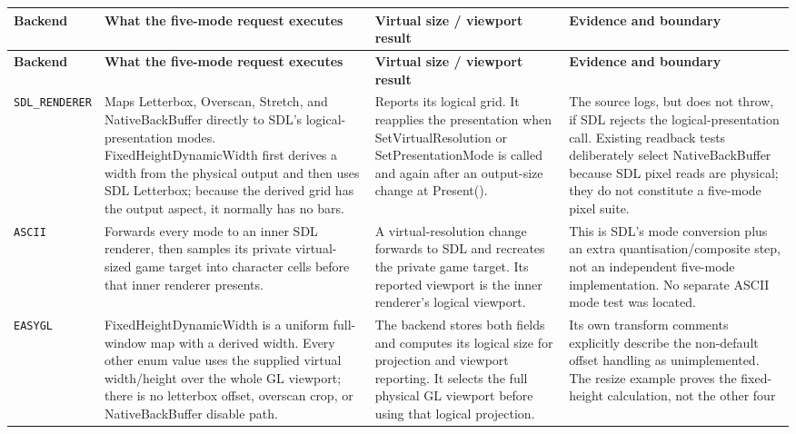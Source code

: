 \begingroup
\small
\setlength{\tabcolsep}{2.7pt}
\renewcommand{\arraystretch}{1.14}
\begin{longtable}{@{}p{}p{}p{}p{}@{}}
\toprule
\textbf{Backend} & \textbf{What the five-mode request executes} &
\textbf{Virtual size / viewport result} & \textbf{Evidence and boundary} \\
\midrule
\endfirsthead
\toprule
\textbf{Backend} & \textbf{What the five-mode request executes} &
\textbf{Virtual size / viewport result} & \textbf{Evidence and boundary} \\
\midrule
\endhead
\texttt{SDL\_\allowbreak RENDERER}
  & Maps Letterbox, Overscan, Stretch, and NativeBackBuffer directly to SDL's logical-
    presentation modes. FixedHeightDynamicWidth first derives a width from the physical output
    and then uses SDL Letterbox; because the derived grid has the output aspect, it normally has
    no bars.
  & Reports its logical grid. It reapplies the presentation when SetVirtualResolution or
    SetPresentationMode is called and again after an output-size change at Present().
  & The source logs, but does not throw, if SDL rejects the logical-presentation call. Existing
    readback tests deliberately select NativeBackBuffer because SDL pixel reads are physical;
    they do not constitute a five-mode pixel suite. \\
\texttt{ASCII}
  & Forwards every mode to an inner SDL renderer, then samples its private virtual-sized game
    target into character cells before that inner renderer presents.
  & A virtual-resolution change forwards to SDL and recreates the private game target. Its
    reported viewport is the inner renderer's logical viewport.
  & This is SDL's mode conversion plus an extra quantisation/composite step, not an independent
    five-mode implementation. No separate ASCII mode test was located. \\
\texttt{EASYGL}
  & FixedHeightDynamicWidth is a uniform full-window map with a derived width. Every other enum
    value uses the supplied virtual width/height over the whole GL viewport; there is no
    letterbox offset, overscan crop, or NativeBackBuffer disable path.
  & The backend stores both fields and computes its logical size for projection and viewport
    reporting. It selects the full physical GL viewport before using that logical projection.
  & Its own transform comments explicitly describe the non-default offset handling as
    unimplemented. The resize example proves the fixed-height calculation, not the other four

\end{longtable}
